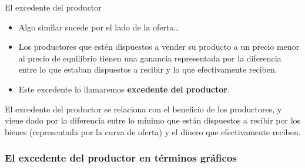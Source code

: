 \documentclass{beamer}
\begin{document}
\begin{frame}{El excedente del productor}
  \begin{itemize}
    \item Algo similar sucede por el lado de la oferta\dots
    \item Los productores que estén dispuestos a vender su producto a un precio menor al precio de equilibrio tienen una ganancia representada por la diferencia entre lo que estaban dispuestos a recibir y lo que efectivamente reciben.
    \item Este excedente lo llamaremos \textbf{excedente del productor}.
  \end{itemize}
  \vspace{2mm}
  \begin{boxB}
  \centering
  El excedente del productor se relaciona con el beneficio de los productores, y viene dado por la diferencia entre lo mínimo que están dispuestos a recibir por los bienes (representada por la curva de oferta) y el dinero que efectivamente reciben.      
  \end{boxB}
\end{frame}

\begin{frame}
\frametitle{El excedente del productor en términos gráficos}
    \begin{figure}[H]
    \begin{center}
    \end{center}
    \end{figure}
\end{frame}
\end{document}
